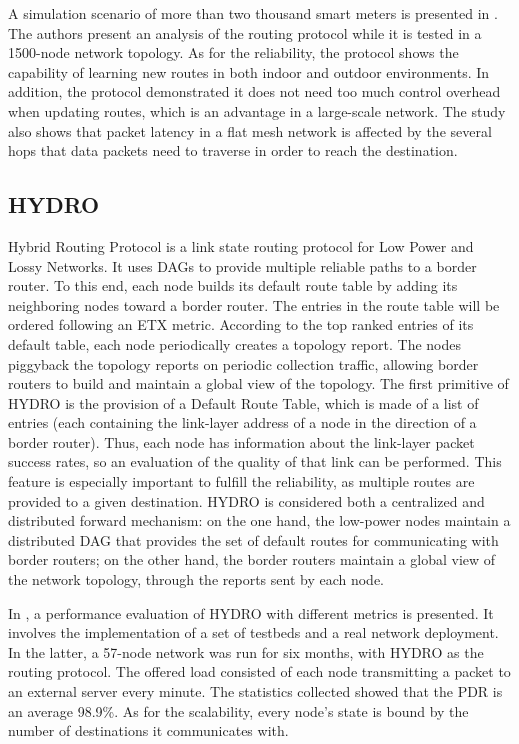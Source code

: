 \documentclass[11pt,draftclsnofoot,onecolumn]{IEEEtran}
\begin{document}
A simulation scenario of more than two thousand smart meters is presented in \cite{Iwao2010}. The authors present an analysis of the routing protocol while it is tested in a 1500-node network topology. As for the reliability, the protocol shows the capability of learning new routes in both indoor and outdoor environments. In addition, the protocol demonstrated it does not need too much control overhead when updating routes, which is an advantage in a large-scale network. The study also shows that packet latency in a flat mesh network is affected by the several hops that data packets need to traverse in order to reach the destination.

\subsection{HYDRO}\label{hydro}


Hybrid Routing Protocol \cite{Dawson2010} is a link state routing protocol for Low Power and Lossy Networks. It uses DAGs to provide multiple reliable paths to a border router. To this end, each node builds its default route table by adding its neighboring nodes toward a border router. The entries in the route table will be ordered following an ETX metric. According to the top ranked entries of its default table, each node periodically creates a topology report. The nodes piggyback the topology reports on periodic collection traffic, allowing border routers to build and maintain a global view of the topology. The first primitive of HYDRO is the provision of a Default Route Table, which is made of a list of entries (each containing the link-layer address of a node in the direction of a border router). Thus, each node has information about the link-layer packet success rates, so an evaluation of the quality of that link can be performed. This feature is especially important to fulfill the reliability, as multiple routes are provided to a given destination. HYDRO is considered both a centralized and distributed forward mechanism: on the one hand, the low-power nodes maintain a distributed DAG that provides the set of default routes for communicating with border routers; on the other hand, the border routers maintain a global view of the network topology, through the reports sent by each node. 

In \cite{Dawson2010}, a performance evaluation of HYDRO with different metrics is presented. It involves the implementation of a set of testbeds and a real network deployment. In the latter, a 57-node network was run for six months, with HYDRO as the routing protocol. The offered load consisted of each node transmitting a packet to an external server every minute. The statistics collected showed that the PDR is an average 98.9\%. As for the scalability, every node's state is bound by the number of destinations it communicates with. 
\end{document}
